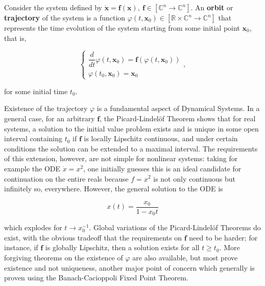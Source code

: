\begin{definition} Consider the system defined by $\dot{\mathbf{x}} = \mathbf{f(x)},\ \mathbf{f}\in\left[\mathbb{C}^n\to\mathbb{C}^n\right]$. An \textbf{orbit} or \textbf{trajectory} of the system is a function $\varphi\left(t,\mathbf{x}_0\right)\in\left[\mathbb{R}\times\mathbb{C}^n\to\mathbb{C}^n\right]$ that represents the time evolution of the system starting from some initial point $\mathbf{x}_0$, that is, 

\begin{equation}\left\{\begin{array}{l} \dfrac{d}{dt} \varphi\left(t,\mathbf{x}_0\right) = \mathbf{f}\left(\varphi\left(t,\mathbf{x}_0\right)\right) \\[3mm] \varphi\left(t_0,\mathbf{x}_0\right) = \mathbf{x}_0\end{array}\right. , \end{equation}

	\noindent for some initial time $t_0$.
\end{definition}

	Existence of the trajectory $\varphi$ is a fundamental aspect of Dynamical Systems. In a general case, for an arbitrary $\mathbf{f}$, the Picard-Lindelöf Theorem  shows that for real systems, a solution to the initial value problem exists and is unique in some open interval containing $t_0$ if $\mathbf{f}$ is locally Lipschitz continuous, and under certain conditions the solution can be extended to a maximal interval. The requirements of this extension, however, are not simple for nonlinear systems: taking for example the ODE $\dot{x} = x^2$, one initially guesses this is an ideal candidate for continuation on the entire reals because $f = x^2$ is not only continuous but infinitely so, everywhere. However, the general solution to the ODE is

\begin{equation} x(t) = \dfrac{x_0}{1 - x_0 t} \end{equation}

	\noindent which explodes for $t\to x_0^{-1}$. Global variations of the Picard-Lindelöf Theorems do exist, with the obvious tradeoff that the requirements on $\mathbf{f}$ need to be harder; for instance, if $\mathbf{f}$ is globally Lipschitz, then a solution exists for all $t \geq t_0$. More forgiving theorems on the existence of $\varphi$ are also available, but most prove existence and not uniqueness, another major point of concern which generally is proven using the Banach-Cacioppoli Fixed Point Theorem.

